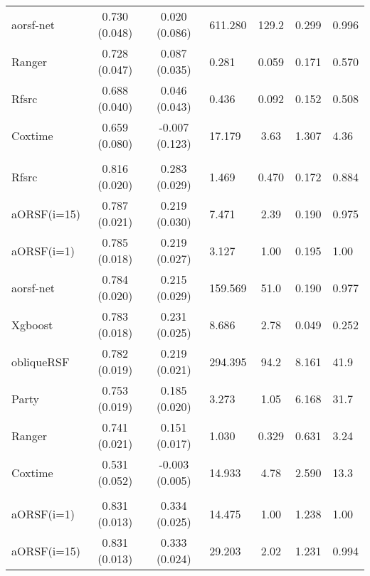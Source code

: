 \documentclass[twoside,11pt]{article}\usepackage[]{graphicx}\usepackage[]{color}
\newenvironment{knitrout}{}{} %
\begin{document}
\begin{knitrout}
\begin{longtable}{lcclccl}
\hspace{1em}aorsf-net & 0.730 (0.048) & 0.020 (0.086) & 611.280 & 129.2 & 0.299 & 0.996\\
\hspace{1em}Ranger & 0.728 (0.047) & 0.087 (0.035) & 0.281 & 0.059 & 0.171 & 0.570\\
\hspace{1em}Rfsrc & 0.688 (0.040) & 0.046 (0.043) & 0.436 & 0.092 & 0.152 & 0.508\\
\hspace{1em}Coxtime & 0.659 (0.080) & -0.007 (0.123) & 17.179 & 3.63 & 1.307 & 4.36\\
\addlinespace[0.3em]
\hline
\multicolumn{7}{l}{\textit{\textbf{colon}}}\\
\hline
\hspace{1em}Rfsrc & 0.816 (0.020) & 0.283 (0.029) & 1.469 & 0.470 & 0.172 & 0.884\\
\hspace{1em}aORSF(i=15) & 0.787 (0.021) & 0.219 (0.030) & 7.471 & 2.39 & 0.190 & 0.975\\
\hspace{1em}aORSF(i=1) & 0.785 (0.018) & 0.219 (0.027) & 3.127 & 1.00 & 0.195 & 1.00\\
\hspace{1em}aorsf-net & 0.784 (0.020) & 0.215 (0.029) & 159.569 & 51.0 & 0.190 & 0.977\\
\hspace{1em}Xgboost & 0.783 (0.018) & 0.231 (0.025) & 8.686 & 2.78 & 0.049 & 0.252\\
\hspace{1em}obliqueRSF & 0.782 (0.019) & 0.219 (0.021) & 294.395 & 94.2 & 8.161 & 41.9\\
\hspace{1em}Party & 0.753 (0.019) & 0.185 (0.020) & 3.273 & 1.05 & 6.168 & 31.7\\
\hspace{1em}Ranger & 0.741 (0.021) & 0.151 (0.017) & 1.030 & 0.329 & 0.631 & 3.24\\
\hspace{1em}Coxtime & 0.531 (0.052) & -0.003 (0.005) & 14.933 & 4.78 & 2.590 & 13.3\\
\addlinespace[0.3em]
\hline
\multicolumn{7}{l}{\textit{\textbf{flchain}}}\\
\hline
\hspace{1em}aORSF(i=1) & 0.831 (0.013) & 0.334 (0.025) & 14.475 & 1.00 & 1.238 & 1.00\\
\hspace{1em}aORSF(i=15) & 0.831 (0.013) & 0.333 (0.024) & 29.203 & 2.02 & 1.231 & 0.994\\

\end{longtable}
\end{knitrout}
\end{document}
